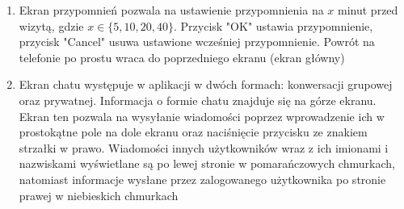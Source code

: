 \documentclass[12pt]{article}
\begin{document}
\begin {enumerate}
	\item Ekran przypomnień pozwala na ustawienie przypomnienia na $x$ minut przed wizytą, gdzie $x\in\{5, 10, 20, 40\}$. Przycisk "OK" ustawia przypomnienie, przycisk "Cancel" usuwa ustawione wcześniej przypomnienie. Powrót na telefonie po prostu wraca do poprzedniego ekranu (ekran główny)
	
	\item Ekran chatu występuje w aplikacji w dwóch formach: konwersacji grupowej oraz prywatnej. Informacja o formie chatu znajduje się na górze ekranu. Ekran ten pozwala na wysyłanie wiadomości poprzez wprowadzenie ich w prostokątne pole na dole ekranu oraz naciśnięcie przycisku ze znakiem strzałki w prawo. Wiadomości innych użytkowników wraz z ich imionami i nazwiskami wyświetlane są po lewej stronie w pomarańczowych chmurkach, natomiast informacje wysłane przez zalogowanego użytkownika po stronie prawej w niebieskich chmurkach
	
\end{enumerate}


\clearpage
\end{document}
